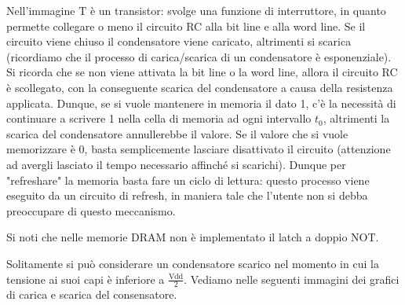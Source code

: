 \documentclass[class=book, crop=false, oneside]{standalone}
\begin{document}
Nell'immagine \(\textrm{T}\) è un transistor: svolge una funzione di interruttore, in quanto permette collegare o meno il circuito RC alla bit line e alla word line. Se il circuito viene chiuso il condensatore viene caricato, altrimenti si scarica (ricordiamo che il processo di carica/scarica di un condensatore è esponenziale). Si ricorda che se non viene attivata la bit line o la word line, allora il circuito RC è scollegato, con la conseguente scarica del condensatore a causa della resistenza applicata. Dunque, se si vuole mantenere in memoria il dato 1, c'è la necessità di continuare a scrivere 1 nella cella di memoria ad ogni intervallo \(t_0\), altrimenti la scarica del condensatore annullerebbe il valore. Se il valore che si vuole memorizzare è 0, basta semplicemente lasciare disattivato il circuito (attenzione ad avergli lasciato il tempo necessario affinché si scarichi). Dunque per "refreshare" la memoria basta fare un ciclo di lettura: questo processo viene eseguito da un circuito di refresh, in maniera tale che l'utente non si debba preoccupare di questo meccanismo.

Si noti che nelle memorie DRAM non è implementato il latch a doppio NOT.

Solitamente si può considerare un condensatore scarico nel momento in cui la tensione ai suoi capi è inferiore a \(\frac{\textrm{Vdd}}{2}\). Vediamo nelle seguenti immagini dei grafici di carica e scarica del consensatore.

\end{document}
